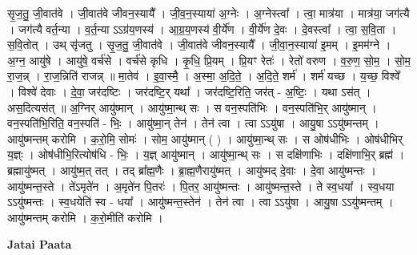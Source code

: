 \documentclass[17pt]{extarticle}
\begin{document}
सृ॒ज॒तु॒ जी॒वात॑वे । जी॒वात॑वे जीवन॒स्यायै᳚ । जी॒व॒न॒स्याया॑ अ॒ग्नेः । अ॒ग्नेस्त्वा᳚ । त्वा॒ मात्र॑या । मात्र॑या॒ जग॑त्यै । जग॑त्यै वर्त॒न्या । व॒र्त॒न्या ऽऽग्र॑य॒णस्य॑ । आ॒ग्र॒य॒णस्य॑ वी॒र्ये॑ण । वी॒र्ये॑ण दे॒वः । दे॒वस्त्वा᳚ । त्वा॒ स॒वि॒ता । स॒वि॒तोत् । उथ् सृ॑जतु । सृ॒ज॒तु॒ जी॒वात॑वे । जी॒वात॑वे जीवन॒स्यायै᳚ । जी॒वा॒न॒स्याया॑ इ॒मम् । इ॒मम॑ग्ने । अ॒ग्न॒ आयु॑षे । आयु॑षे॒ वर्च॑से । वर्च॑से कृधि । कृ॒धि॒ प्रि॒यम् । प्रि॒यꣳ रेतः॑ । रेतो॑ वरुण । व॒रु॒ण॒ सो॒म॒ । सो॒म॒ रा॒ज॒न्न् । रा॒ज॒न्निति॑ राजन्न् ॥ मा॒तेव॑ । इ॒वा॒स्मै॒ । अ॒स्मा॒ अ॒दि॒ते॒ । अ॒दि॒ते॒ शर्म॑ । शर्म॑ यच्छ । य॒च्छ॒ विश्वे᳚ । विश्वे॑ देवाः । दे॒वा॒ जर॑दष्टिः । जर॑दष्टि॒र् यथा᳚ । जर॑दष्टि॒रिति॒ जर॑त् - अ॒ष्टिः॒ । यथा ऽस॑त् । अस॒दित्यस॑त् ॥ अ॒ग्निर् आयु॑ष्मान् । आयु॑ष्मा॒न्थ् सः । स वन॒स्पति॑भिः । वन॒स्पति॑भि॒र् आयु॑ष्मान् । वन॒स्पति॑भि॒रिति॒ वन॒स्पति॑ - भिः॒ । आयु॑ष्मा॒न् तेन॑ । तेन॑ त्वा । त्वा ऽऽयु॑षा । आयु॒षा ऽऽयु॑ष्मन्तम् । आयु॑ष्मन्तम् करोमि । क॒रो॒मि॒ सोमः॑ । सोम॒ आयु॑ष्मान् ( ) । आयु॑ष्मा॒न्थ् सः । स ओष॑धीभिः । ओष॑धीभिर् य॒ज्ञ्ः । ओष॑धीभि॒रित्योष॑धि - भिः॒ । य॒ज्ञ् आयु॑ष्मान् । आयु॑ष्मा॒न्थ् सः । स दक्षि॑णाभिः । दक्षि॑णाभि॒र् ब्रह्म॑ । ब्रह्मायु॑ष्मत् । आयु॑ष्म॒त् तत् । तद् ब्रा᳚ह्म॒णैः । ब्रा॒ह्म॒णैरायु॑ष्मत् । आयु॑ष्मद् दे॒वाः । दे॒वा आयु॑ष्मन्तः । आयु॑ष्मन्त॒स्ते । ते॑ऽमृते॑न । अ॒मृते॑न पि॒तरः॑ । पि॒तर॒ आयु॑ष्मन्तः । आयु॑ष्मन्त॒स्ते । ते स्व॒धया᳚ । स्व॒धया ऽऽयु॑ष्मन्तः । स्व॒धयेति॑ स्व - धया᳚ । आयु॑ष्मन्त॒स्तेन॑ । तेन॑ त्वा । त्वा ऽऽयु॑षा । आयु॒षा ऽऽयु॑ष्मन्तम् । आयु॑ष्मन्तम् करोमि । क॒रो॒मीति॑ करोमि । \newline

\textbf{Jatai Paata} \newline
\end{document}
